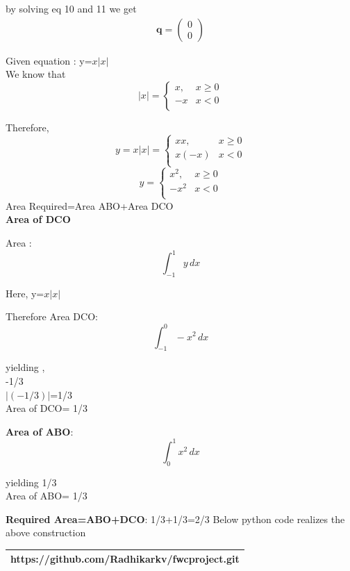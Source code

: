 \documentclass[10pt, a4paper]{article}
\newcommand{\myvec}[1]{\ensuremath{\begin{pmatrix}#1\end{pmatrix}}}
\let\vec\mathbf
\begin{document}
by solving eq 10 and 11 we get\\
\begin{align}
\vec{q}=\myvec{0\\0}
\end{align}


 Given equation :  y=$x|x|$\\

We know that \\
\begin{equation}
   |x| =
    \begin{cases}
      x, & {x\geq0}\\
      -x & {x<0}\\
    \end{cases}       
\end{equation}

	Therefore,
\begin{equation}
   y=x|x| =
    \begin{cases}
      xx, & {x\geq0}\\
      x(-x) & {x<0}\\
    \end{cases}       
\end{equation}
\begin{equation}
   y =
    \begin{cases}
      x^2, & {x\geq0}\\
      -x^2 & {x<0}\\
    \end{cases}       
\end{equation}
Area Required=Area ABO+Area DCO\\
\textbf{Area of DCO}

Area  : \[ \int_{-1}^{1} y \,dx \]

Here, y=$x|x|$

Therefore Area DCO: \[ \int_{-1}^{0} -x^2 \,dx \]

 yielding ,\\
 
   -1/3 \\
 
 $|(-1/3)|$=1/3\\
 
 Area of DCO= 1/3

\textbf{Area  of ABO}: \[ \int_{0}^{1} x^2 \,dx \]

    yielding 1/3\\
   
     
     Area of ABO= 1/3
     

\textbf{Required Area=ABO+DCO}:
  1/3+1/3=2/3
Below python code realizes the above construction 

\begin{table}[h!]
    \begin{tabular}{|c|}
    \hline
         https://github.com/Radhikarkv/fwcproject.git\\
	\hline
    \end{tabular}
\end{table}
\end{document}

